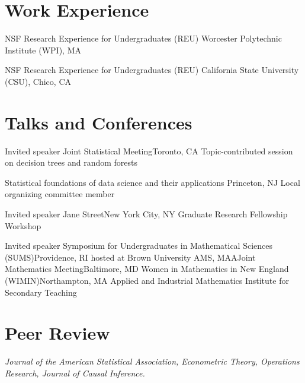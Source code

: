 \documentclass[10pt,a4paper,roman]{moderncv}        %
\begin{document}
\vspace{-0.3cm}
\section{Work Experience}
{NSF Research Experience for Undergraduates (REU) }
{Worcester Polytechnic Institute (WPI), MA}
{} {
}

{NSF Research Experience for Undergraduates (REU)}
{California State University (CSU), Chico, CA}
{}
{}

\vspace{-0.3cm}
\section{Talks and Conferences}
{Invited speaker}
{Joint Statistical Meeting}{Toronto, CA}
{Topic-contributed session on decision trees and random forests}
{}

{Statistical foundations of data science and their applications}
{Princeton, NJ}
{}{Local organizing committee member}

{Invited speaker}
{Jane Street}{New York City, NY}
{Graduate Research Fellowship Workshop}
{}

{Invited speaker}
{Symposium for Undergraduates in Mathematical Sciences (SUMS)}{Providence, RI}
{hosted at Brown University}
{}
{AMS, MAA}{Joint Mathematics Meeting}{Baltimore, MD}
{}{}
{Women in Mathematics in New England (WIMIN)}{Northampton, MA}
{}{}
{Applied and Industrial Mathematics Institute for Secondary Teaching}
{}

\vspace{-0.3cm}
\section{Peer Review}
\textit{
Journal of the American Statistical Association, Econometric Theory, Operations
Research, Journal of Causal Inference.
}
\end{document}
